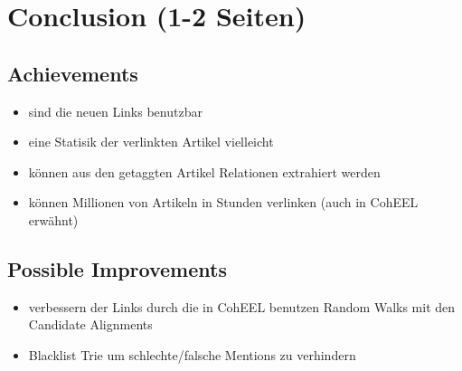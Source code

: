 \section{Conclusion (1-2 Seiten)}
\label{sec:Conclusion}
	\subsection*{Achievements}
	\begin{itemize}
		\item sind die neuen Links benutzbar
		\item eine Statisik der verlinkten Artikel vielleicht
		\item können aus den getaggten Artikel Relationen extrahiert werden
		\item können Millionen von Artikeln in Stunden verlinken (auch in CohEEL erwähnt)
	\end{itemize}

	\subsection*{Possible Improvements}
	\begin{itemize}
		\item verbessern der Links durch die in CohEEL benutzen Random Walks mit den Candidate Alignments
		\item Blacklist Trie um schlechte/falsche Mentions zu verhindern
	\end{itemize}

